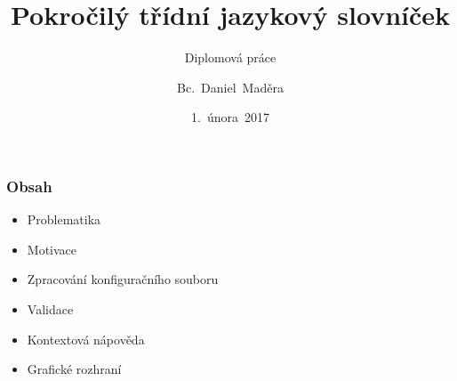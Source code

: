 




\usepackage{palatino}
\usepackage{graphicx}
\usepackage{transparent}


\title[Pokročilý třídní jazykový slovníček]{Pokročilý třídní jazykový slovníček}
\subtitle{Diplomová práce}
\author[Bc.~Daniel~Maděra]{Bc.~Daniel~Maděra}
\date{1.~února~2017}
\newcommand{\TextTitulniStranaPodLinkou}{\tiny
Studentská 2 {\color{FM_TUL} |} 461\,17 Liberec 2 {\color{FM_TUL} |} {daniel.madera@tul.cz} {\color{FM_TUL} |} 
\href{http://www.fm.tul.cz/}{www.fm.tul.cz}}

\renewcommand{\inserttotalframenumber}{\pageref{lastslide}}




\begin{frame}
	\titlepage
\end{frame}

\begin{frame}
	\frametitle{Obsah}
	\begin{itemize}
		\item Problematika
		\item Motivace
		\item Zpracování konfiguračního souboru
		\item Validace
		\item Kontextová nápověda
		\item Grafické rozhraní
	\end{itemize}
\end{frame}


	

